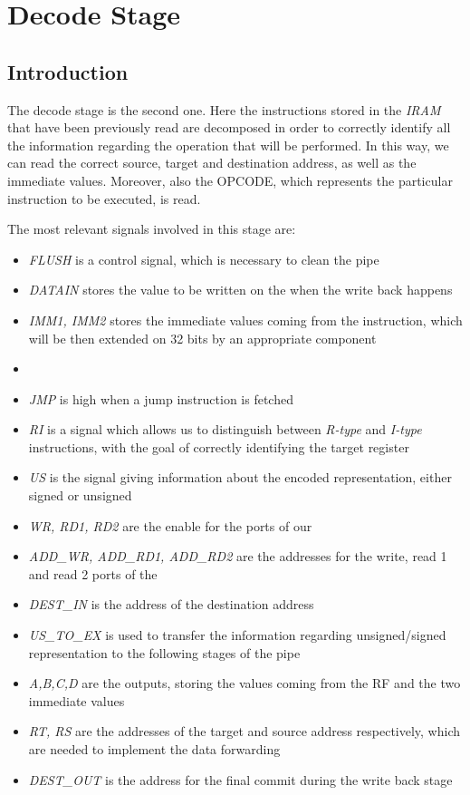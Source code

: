 \section{Decode Stage}
\label{chap_dec}

\subsection{Introduction}
The decode stage is the second one. Here the instructions stored in the \textit{IRAM} that have been previously read are decomposed in order to correctly identify all the information regarding the operation that will be performed. In this way, we can read the correct source, target and destination address, as well as the immediate values. Moreover, also the \textsf{OPCODE}, which represents the particular instruction to be executed, is read.

The most relevant signals involved in this stage are:
\begin{itemize}
	\item \textit{FLUSH} is a control signal, which is necessary to clean the pipe
	\item \textit{DATAIN} stores the value to be written on the \rf when the write back happens
	\item \textit{IMM1, IMM2} stores the immediate values coming from the instruction, which will be then extended on 32 bits by an appropriate component
	\item \textit{}
	\item \textit{JMP} is high when a jump instruction is fetched
	\item \textit{RI} is a signal which allows us to distinguish between \textit{R-type} and \textit{I-type} instructions, with the goal of correctly identifying the target register
	\item \textit{US} is the signal giving information about the encoded representation, either signed or unsigned
	\item \textit{WR, RD1, RD2} are the enable for the ports of our \rf
	\item \textit{ADD\_WR, ADD\_RD1, ADD\_RD2} are the addresses for the write, read 1 and read 2 ports of the \rf
	\item \textit{DEST\_IN} is the address of the destination address
	\item \textit{US\_TO\_EX} is used to transfer the information regarding unsigned/signed representation to the following stages of the pipe
	\item \textit{A,B,C,D} are the outputs, storing the values coming from the \textsf{RF} and the two immediate values
	\item \textit{RT, RS} are the addresses of the target and source address respectively, which are needed to implement the data forwarding
	\item \textit{DEST\_OUT} is the address for the final commit during the write back stage
\end{itemize}

